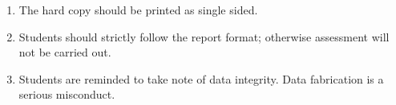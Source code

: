 \begin{enumerate}[nosep, leftmargin=*]
	
	\item The hard copy should be printed as single sided.
	
	\item Students should strictly follow the report format; otherwise assessment will not be carried out.
	
	\item Students are reminded to take note of data integrity. Data fabrication is a serious misconduct.
\end{enumerate}

\endgroup %